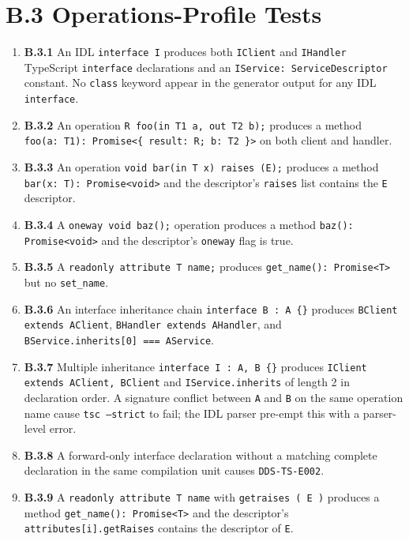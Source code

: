 \documentclass{../styles/zerodds-vendor-spec}
\begin{document}
\section*{B.3 Operations-Profile Tests}

\begin{enumerate}
  \item \textbf{B.3.1} An IDL \texttt{interface I} produces both
        \texttt{IClient} and \texttt{IHandler} TypeScript
        \texttt{interface} declarations and an \texttt{IService:
        ServiceDescriptor} constant. No \texttt{class} keyword
         appear in the generator output for any IDL
        \texttt{interface}.
  \item \textbf{B.3.2} An operation
        \texttt{R foo(in T1 a, out T2 b);} produces a method
        \texttt{foo(a:\,T1):\,Promise<\{ result:\,R; b:\,T2 \}>}
        on both client and handler.
  \item \textbf{B.3.3} An operation
        \texttt{void bar(in T x) raises (E);} produces a method
        \texttt{bar(x:\,T):\,Promise<void>} and the descriptor's
        \texttt{raises} list contains the \texttt{E} descriptor.
  \item \textbf{B.3.4} A \texttt{oneway void baz();} operation
        produces a method \texttt{baz():\,Promise<void>} and the
        descriptor's \texttt{oneway} flag is true.
  \item \textbf{B.3.5} A \texttt{readonly attribute T name;}
        produces \texttt{get\_name():\,Promise<T>} but no
        \texttt{set\_name}.
  \item \textbf{B.3.6} An interface inheritance chain
        \texttt{interface B :\,A \{\}} produces
        \texttt{BClient extends AClient},
        \texttt{BHandler extends AHandler}, and
        \texttt{BService.inherits[0]\,===\,AService}.
  \item \textbf{B.3.7} Multiple inheritance
        \texttt{interface I :\,A,\,B \{\}} produces
        \texttt{IClient extends AClient,\,BClient} and
        \texttt{IService.inherits} of length 2 in declaration
        order. A signature conflict between \texttt{A} and
        \texttt{B} on the same operation name  cause
        \texttt{tsc --strict} to fail; the IDL parser
         pre-empt this with a parser-level error.
  \item \textbf{B.3.8} A forward-only interface declaration
        without a matching complete declaration in the same
        compilation unit causes \texttt{DDS-TS-E002}.
  \item \textbf{B.3.9} A \texttt{readonly attribute T name} with
        \texttt{getraises\,(\,E\,)} produces a method
        \texttt{get\_name():\,Promise<T>} and the descriptor's
        \texttt{attributes[i].getRaises} contains the descriptor
        of \texttt{E}.
\end{enumerate}
\end{document}
